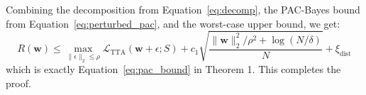 \documentclass{article}
\begin{document}
Combining the decomposition from Equation~\eqref{eq:decomp}, the PAC-Bayes bound from Equation~\eqref{eq:perturbed_pac}, and the worst-case upper bound, we get:
\begin{equation}
    R(\mathbf{w}) \le \max_{\|\epsilon\|_2 \le \rho} \mathcal{L}_{\text{TTA}}(\mathbf{w} + \epsilon; S) + c_1 \sqrt{\frac{\|\mathbf{w}\|_2^2 / \rho^2 + \log(N / \delta)}{N}} + \xi_{\text{dist}}
\end{equation}
which is exactly Equation~\eqref{eq:pac_bound} in Theorem 1. This completes the proof.
\end{document}
